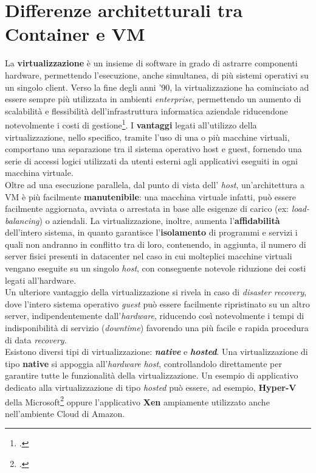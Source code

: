 \section{Differenze architetturali tra Container e VM}
La \textbf{virtualizzazione} è un insieme di software in grado di astrarre componenti \gls{hardware}, permettendo l'esecuzione, anche simultanea, di più \gls{sistemi operativi} su un singolo \gls{client}. Verso la fine degli anni '90, la virtualizzazione ha cominciato ad essere sempre più utilizzata in ambienti \textit{enterprise}, permettendo un aumento di scalabilità e flessibilità dell'infrastruttura informatica aziendale riducendone notevolmente i costi di gestione\footcite{fonte: https://www.vmware.com/it/solutions/virtualization.html}. I \textbf{vantaggi} legati all'utilizzo della virtualizzazione, nello specifico, tramite l'uso di una o più macchine virtuali, comportano una separazione tra il sistema operativo \gls{host} e \gls{guest}, fornendo una serie di accessi logici utilizzati da utenti esterni agli applicativi eseguiti in ogni macchina virtuale. \\
Oltre ad una esecuzione parallela, dal punto di vista dell' \textit{host}, un'architettura a VM è più facilmente \textbf{manutenibile}: una macchina virtuale infatti, può essere facilmente aggiornata, avviata o arrestata in base alle esigenze di carico (ex: \textit{\gls{load-balancing}}) o aziendali.
La virtualizzazione, inoltre, aumenta l'\textbf{affidabilità} dell'intero sistema, in quanto garantisce l'\textbf{isolamento} di programmi e servizi i quali non andranno in conflitto tra di loro, contenendo, in aggiunta, il numero di server fisici presenti in \gls{datacenter} nel caso in cui molteplici macchine virtuali vengano eseguite su un singolo \textit{host}, con conseguente notevole riduzione dei costi legati all'hardware.\\
Un ulteriore vantaggio della virtualizzazione si rivela in caso di \textit{\gls{disaster recovery}}, dove l'intero sistema operativo \textit{guest} può essere facilmente ripristinato su un altro server, indipendentemente dall'\textit{hardware}, riducendo così notevolmente i tempi di indisponibilità di servizio (\textit{downtime})  favorendo una più facile e rapida procedura di data \textit{\gls{recovery}}.\\
Esistono diversi tipi di virtualizzazione: \textbf{\textit{native}} e \textbf{\textit{hosted}}.
Una virtualizzazione di tipo \textbf{native} si appoggia all'\textit{hardware} \textit{host}, controllandolo direttamente per garantire tutte le funzionalità della virtualizzazione. Un esempio di applicativo dedicato alla virtualizzazione di tipo \textit{hosted} può essere, ad esempio, \textbf{\gls{Hyper-V}} della Microsoft\footcite{questa funzionalita' e' presente solamente nelle versioni Pro e Server di Windows 10} oppure l'applicativo \textbf{\gls{Xen}} ampiamente utilizzato anche nell'ambiente Cloud di Amazon.

